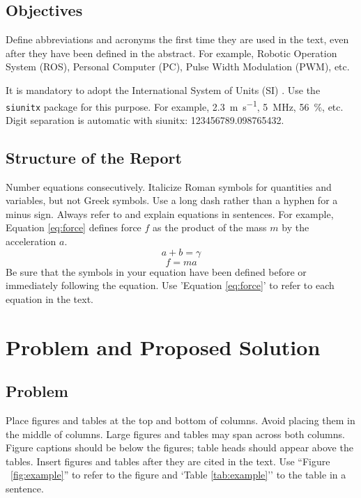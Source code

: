 \documentclass[conference]{IEEEtran}
\begin{document}
\subsection{Objectives}
Define abbreviations and acronyms the first time they are used in the text, even after they have been defined in the abstract. For example, Robotic Operation System (ROS), Personal Computer (PC), Pulse Width Modulation (PWM), etc.

It is mandatory to adopt the International System of Units (SI) \cite{siunitx_2023}. Use the \texttt{\small siunitx} package for this purpose. For example, \SI{2.3}{\metre\per\second}, \SI{5}{\mega\hertz}, \SI{56}{\percent}, etc. Digit separation is automatic with siunitx: \num{123456789.098765432}.

\subsection{Structure of the Report}
Number equations consecutively. Italicize Roman symbols for quantities and variables, but not Greek symbols. Use a long dash rather than a hyphen for a minus sign. Always refer to and explain equations in sentences. For example, Equation \eqref{eq:force} defines force $f$ as the product of the mass $m$ by the acceleration $a$.
\begin{equation}
a+b=\gamma\label{eq:sum}
\end{equation}
\begin{equation}
f=ma\label{eq:force}
\end{equation} 
Be sure that the symbols in your equation have been defined before or immediately following the equation. Use 'Equation \eqref{eq:force}' to refer to each equation in the text.

\section{Problem and Proposed Solution}

\subsection{Problem}
Place figures and tables at the top and bottom of columns. Avoid placing them in the middle of columns. Large figures and tables may span across both columns. Figure captions should be below the figures; table heads should appear above the tables. Insert figures and tables after they are cited in the text. Use ``Figure ~\ref{fig:example}'' to refer to the figure and `Table \ref{tab:example}'' to the table in a sentence.
\end{document}
